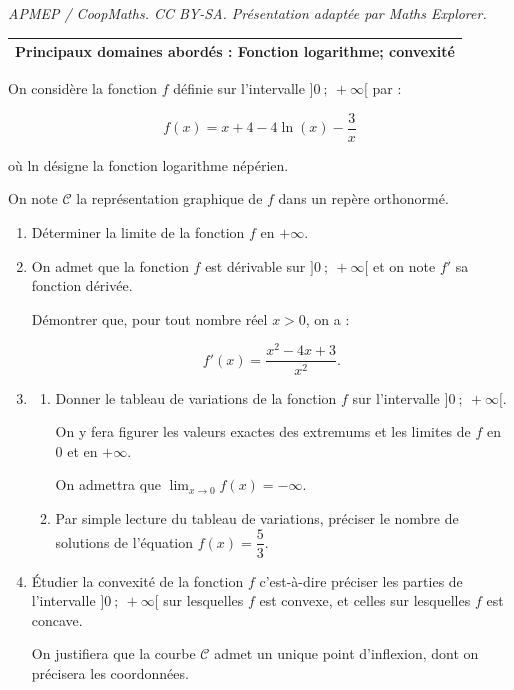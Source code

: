 \documentclass[10pt]{article}
\begin{document}
\noindent\textit{APMEP / CoopMaths. CC BY-SA. Présentation adaptée par Maths Explorer.}\par\medskip
\medskip

\begin{tabularx}{\linewidth}{|X|}\hline
\textbf{Principaux domaines abordés : Fonction logarithme; convexité}
\\ \hline
\end{tabularx}

\medskip

On considère la fonction $f$ définie sur l'intervalle $]0~;~ +\infty[$ par :

\[f(x) = x + 4 - 4 \ln (x) - \dfrac{3}{x}\]

où ln désigne la fonction logarithme népérien.

On note $\mathcal{C}$ la représentation graphique de $f$ dans un repère orthonormé.

\medskip

\begin{enumerate}
\item Déterminer la limite de la fonction $f$ en $+\infty$.
\item On admet que la fonction $f$ est dérivable sur $]0~;~ +\infty[$ et on note $f'$ sa fonction dérivée.

Démontrer que, pour tout nombre réel $x > 0$, on a :

\[f'(x) = \dfrac{x^2 - 4x + 3}{x^2}.\]

\item
	\begin{enumerate}
		\item Donner le tableau de variations de la fonction $f$ sur l'intervalle $]0~;~ +\infty[$. 
		
On y fera figurer les valeurs exactes des extremums et les limites de $f$ en $0$ et en $+ \infty$. 
		
On admettra que $\displaystyle\lim_{x \to 0} f(x) = - \infty$.
		\item Par simple lecture du tableau de variations, préciser le nombre de solutions de l'équation $f(x) = \dfrac{5}{3}$.
	\end{enumerate}
\item Étudier la convexité de la fonction $f$ c'est-à-dire préciser les parties de l'intervalle $]0~;~ +\infty[$ sur lesquelles $f$ est convexe, et celles sur lesquelles $f$ est concave. 

On justifiera que la courbe $\mathcal C$ admet un unique point d'inflexion, dont on précisera les coordonnées.
\end{enumerate}
\end{document}
